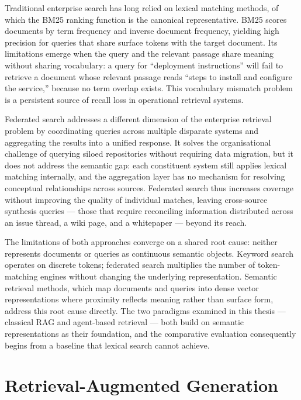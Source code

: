 Traditional enterprise search has long relied on lexical matching methods, of which the BM25 ranking function is the canonical representative. BM25 scores documents by term frequency and inverse document frequency, yielding high precision for queries that share surface tokens with the target document. Its limitations emerge when the query and the relevant passage share meaning without sharing vocabulary: a query for ``deployment instructions'' will fail to retrieve a document whose relevant passage reads ``steps to install and configure the service,'' because no term overlap exists. This vocabulary mismatch problem is a persistent source of recall loss in operational retrieval systems.

Federated search addresses a different dimension of the enterprise retrieval problem by coordinating queries across multiple disparate systems and aggregating the results into a unified response. It solves the organisational challenge of querying siloed repositories without requiring data migration, but it does not address the semantic gap: each constituent system still applies lexical matching internally, and the aggregation layer has no mechanism for resolving conceptual relationships across sources. Federated search thus increases coverage without improving the quality of individual matches, leaving cross-source synthesis queries — those that require reconciling information distributed across an issue thread, a wiki page, and a whitepaper — beyond its reach.

The limitations of both approaches converge on a shared root cause: neither represents documents or queries as continuous semantic objects. Keyword search operates on discrete tokens; federated search multiplies the number of token-matching engines without changing the underlying representation. Semantic retrieval methods, which map documents and queries into dense vector representations where proximity reflects meaning rather than surface form, address this root cause directly. The two paradigms examined in this thesis — classical RAG and agent-based retrieval — both build on semantic representations as their foundation, and the comparative evaluation consequently begins from a baseline that lexical search cannot achieve.


\section{Retrieval-Augmented Generation}

